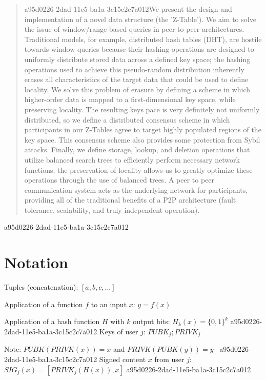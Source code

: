 \documentclass[12pt]{article}
\begin{document}
\maketitle

\begin{abstract}
a95d0226-2dad-11e5-ba1a-3c15c2c7a012We present the design and implementation of a novel data structure (the 'Z-Table'). We aim to solve the issue of window/range-based queries in peer to peer architectures. Traditional models, for example,  distributed hash tables (DHT), are hostile towards window queries because their hashing operations are designed to uniformly distribute stored data across a defined key space; the hashing operations used to achieve this pseudo-random distribution inherently erases all characteristics of the target data that could be used to define locality. We solve this problem of erasure by defining a scheme in which higher-order data is mapped to a first-dimensional key space, while preserving locality. The resulting keys pace is very definitely not uniformly distributed, so we define a distributed consensus scheme in which participants in our Z-Tables agree to target highly populated regions of the key space. This consensus scheme also provides some protection from Sybil attacks. Finally, we define storage, lookup, and deletion operations that utilize balanced search trees to efficiently perform necessary network functions; the preservation of locality allows us to greatly optimize these operations through the use of balanced trees. A peer to peer communication system acts as the underlying network for participants, providing all of the traditional benefits of a P2P architecture (fault tolerance, scalability, and truly independent operation).
\end{abstract}
a95d0226-2dad-11e5-ba1a-3c15c2c7a012
\section{Notation}

Tuples (concatenation): $[a,b,c,...]$

Application of a function $f$ to an input $x$: $y=f(x)$

Application of a hash function $H$ with $k$ output bits: $H_{k}(x) = \{0,1\}^k$
a95d0226-2dad-11e5-ba1a-3c15c2c7a012
Keys of user $j$: $ PUBK_j; PRIVK_j $

Note: $PUBK(PRIVK(x)) = x$ and $PRIVK(PUBK(y)) = y$~
a95d0226-2dad-11e5-ba1a-3c15c2c7a012
Signed content $x$ from user $j$: $SIG_j(x) = \left[ PRIVK_j( H(x) ), x \right]$
a95d0226-2dad-11e5-ba1a-3c15c2c7a012
\end{document}
